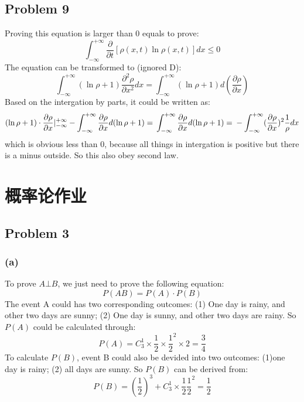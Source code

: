 \documentclass[a4paper]{article}
\begin{document}
\subsection{Problem 9}
Proving this equation is larger than 0 equals to prove:
\begin{equation}
	\int _{-\infty}^{+\infty}\frac{\partial}{\partial t}[\rho(x,t)\ln \rho(x,t)]dx \leq 0
\end{equation}
The equation can be transformed to (ignored D):
\begin{equation}
	\int_{-\infty}^{+\infty}(\ln \rho +1)\frac{\partial^{2}\rho}{\partial x^{2}}dx =
	\int_{-\infty}^{+\infty}(\ln \rho +1) d(\frac{\partial \rho}{\partial x})
\end{equation}
Based on the intergation by parts, it could be written as:
\begin{equation}
	(\ln \rho +1)\cdot \frac{\partial \rho}{\partial x}|_{-\infty}^{+\infty}-\int_{-\infty}^{+\infty}\frac{\partial \rho}{\partial x}d(\ln \rho +1)=\\
	\int_{-\infty}^{+\infty}\frac{\partial \rho}{\partial x}d(\ln \rho +1)=\\
	-\int_{-\infty}^{+\infty}(\frac{\partial \rho}{\partial x})^{2}\frac{1}{\rho}dx
\end{equation}
which is obvious less than 0, because all things in intergation is positive but there is a minus outside. So this also obey second law.

\section{概率论作业}

\subsection{Problem 3}
\subsubsection{(a)}
To prove $A\bot B$, we just need to prove the following equation:
\begin{equation}
	P(AB)=P(A)\cdot P(B)
\end{equation}
The event A could has two corresponding outcomes: (1) One day is rainy, and other two days are sunny; (2) One day is sunny, and other two days are rainy. So $P(A)$ could be calculated through:
\begin{equation}
	P(A)=C_{3}^{1} \times \frac{1}{2} \times \frac{1}{2}^{2} \times 2=\frac{3}{4}
\end{equation}
To calculate $P(B)$, event B could also be devided into two outcomes: (1)one day is rainy; (2) all days are sunny. So $P(B)$ can be derived from:
\begin{equation}
	P(B)=(\frac{1}{2})^{3}+C_{3}^{1}\times \frac{1}{2} \frac{1}{2}^{2}=\frac{1}{2}
\end{equation}
\end{document}
